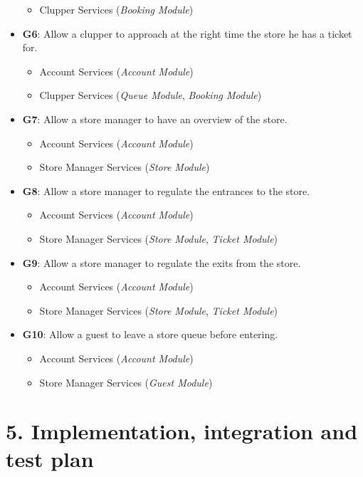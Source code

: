 \begin{itemize}
\begin{itemize}
        \item Clupper Services (\emph{Booking Module})
    \end{itemize}
\item \textbf{G6}: Allow a clupper to approach at the right time the store he has a ticket for.
    \begin{itemize}
        \item Account Services (\emph{Account Module})
        \item Clupper Services (\emph{Queue Module}, \emph{Booking Module})
    \end{itemize}
\item \textbf{G7}: Allow a store manager to have an overview of the store.
    \begin{itemize}
        \item Account Services (\emph{Account Module})
        \item Store Manager Services (\emph{Store Module})
    \end{itemize}
\item \textbf{G8}: Allow a store manager to regulate the entrances to the store.
    \begin{itemize}
        \item Account Services (\emph{Account Module})
        \item Store Manager Services (\emph{Store Module}, \emph{Ticket Module})
    \end{itemize}
\item \textbf{G9}: Allow a store manager to regulate the exits from the store.
    \begin{itemize}
        \item Account Services (\emph{Account Module})
        \item Store Manager Services (\emph{Store Module}, \emph{Ticket Module})
    \end{itemize}
\item \textbf{G10}: Allow a guest to leave a store queue before entering.
    \begin{itemize}
        \item Account Services (\emph{Account Module})
        \item Store Manager Services (\emph{Guest Module})
    \end{itemize}
\end{itemize}

\chapter{5. Implementation, integration and test plan}

